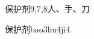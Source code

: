 \begin{entry}{保护剂}{9,7,8}{⼈、⼿、⼑}
  \begin{phonetics}{保护剂}{bao3hu4ji4}
  \end{phonetics}
\end{entry}
